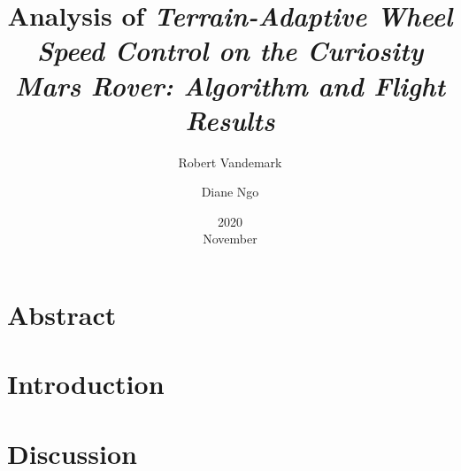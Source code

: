 \documentclass[11pt]{report}
\title{Analysis of \em{Terrain-Adaptive Wheel Speed Control on the Curiosity Mars Rover: Algorithm and Flight Results}}
\date{2020\\ November}
\author{Robert Vandemark \and Diane Ngo}
\begin{document}
	\renewcommand*{\thepage}{\arabic{page}}
	\setcounter{page}{1}
	\maketitle

	\tableofcontents
	\newpage

	\acresetall
	\chapter{Abstract}
	

	\acresetall
	\chapter{Introduction}
	

	\acresetall
	\chapter{Discussion}
	

	\begin{center}
		\printbibliography[heading=bibintoc, title={Bibliography}]
	\end{center}
\end{document}
